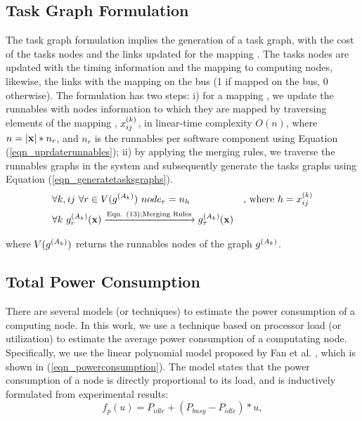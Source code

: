 \subsection{Task Graph Formulation}
The task graph formulation implies the generation of a task graph, with the cost of the tasks nodes and the links updated for the mapping \ttx. The tasks nodes are updated with the timing information and the mapping to computing nodes, likewise, the links with the mapping on the bus (1 if mapped on the bus, 0 otherwise). The formulation has two steps: i) for a mapping \ttx , we update the runnables with nodes information to which they are mapped by traversing elements of the mapping \ttx, $x^{(k)}_{ij}$, in linear-time complexity $O(n)$, where $n=|\textbf{x}|*n_r$, and $n_r$ is the  runnables per software component using Equation (\ref{eqn_uprdaterunnables}); ii) by applying the merging rules, we traverse the runnables graphs in the system and subsequently generate the tasks graphs using Equation (\ref{eqn_generatetasksgraphs}).
\begin{align}
\label{eqn_uprdaterunnables}
&\forall k,ij\ \forall r\in V(\sss{g}[k][])\ node_r = n_h& \mbox{, where } h=\xkij\\
\label{eqn_generatetasksgraphs}
&\forall k\ \sss{g}[k][r](\x)\xrightarrow{\text{Eqn. (13);Merging Rules}}\sss{g}[k][\tau](\x)
\end{align}

where $V(\sss{g}[k][])$ returns the runnables nodes of the graph $\sss{g}[k][]$.

\subsection{Total Power Consumption}
There are several models (or techniques) to estimate the power consumption of a computing node. In this work, we use a technique based on processor load (or utilization) to estimate the average power consumption of a computating node. Specifically, we use the linear polynomial model proposed by Fan et al. \cite{Fan2007PowerComputer}, which is shown in (\ref{eqn_powerconsumption}). The model states that the power consumption of a node is directly proportional to its load, and is inductively formulated from experimental results:
\begin{equation}
\label{eqn_powerconsumption}
f_p(u)=P_{idle} + (P_{busy}-P_{idle})*u,
\end{equation}

